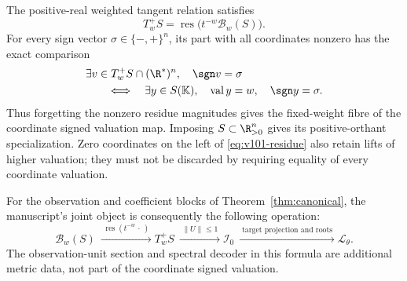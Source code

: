 \begin{theorem}\label{thm:v101-residue}
The positive-real weighted tangent relation satisfies
\begin{equation}\label{eq:v101-residue}
 T_w^+S=\operatorname{res}\bigl(t^{-w}\mathcal B_w(S)\bigr).
\end{equation}
For every sign vector $\sigma\in\{-,+\}^n$, its part with all
coordinates nonzero has the exact comparison
\begin{align}\label{eq:v101-signed-fibre}
 &\exists v\in T_w^+S\cap(\R^*)^n,
                         \quad\sgn v=\sigma\nonumber\\
 &\qquad\Longleftrightarrow\quad
 \exists y\in S(\mathbb K),\quad
       \operatorname{val}y=w,\quad\sgn y=\sigma.
\end{align}
Thus forgetting the nonzero residue magnitudes gives the fixed-weight
fibre of the coordinate signed valuation map. Imposing $S\subset
\R_{>0}^n$ gives its positive-orthant specialization. Zero coordinates
on the left of \eqref{eq:v101-residue} also retain lifts of higher
valuation; they must not be discarded by requiring equality of every
coordinate valuation.

For the observation and coefficient blocks of Theorem~\ref{thm:canonical},
the manuscript's joint object is consequently the following operation:
\begin{equation}\label{eq:v101-comparison-schematic}
 \boxed{\quad
 \mathcal B_w(S)\ \xrightarrow{\;\operatorname{res}(t^{-w}\,\cdot\,)\;}
 T_w^+S\ \xrightarrow{\;\|U\|\le1\;}
 \mathcal I_0\ \xrightarrow{\;\text{target projection and roots}\;}
 \mathcal L_\theta .\quad}
\end{equation}
The observation-unit section and spectral decoder in this formula are
additional metric data, not part of the coordinate signed valuation.
\end{theorem}
